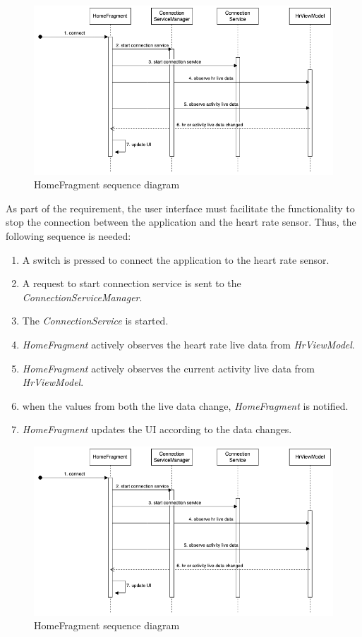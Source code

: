 \begin{figure}[H]
    \centering
    \includegraphics[width=1\textwidth]{diagrams/hr-broadcast-homefragment.drawio.png}
    \caption{HomeFragment sequence diagram}
    \label{fig:homefragment_diagram}
\end{figure}

As part of the requirement, the user interface must facilitate the functionality to stop the connection between the application and the heart rate sensor. Thus, the following sequence is needed:
\begin{enumerate}
    \item A switch is pressed to connect the application to the heart rate sensor.
    \item A request to start connection service is sent to the \emph{ConnectionServiceManager}.
    \item The \emph{ConnectionService} is started.
    \item \emph{HomeFragment} actively observes the heart rate live data from \emph{HrViewModel}.
    \item \emph{HomeFragment} actively observes the current activity live data from \emph{HrViewModel}.
    \item when the values from both the live data change, \emph{HomeFragment} is notified.
    \item \emph{HomeFragment} updates the UI according to the data changes.

\end{enumerate}

\begin{figure}[H]
    \centering
    \includegraphics[width=1\textwidth]{diagrams/hr-broadcast-homefragment.drawio.png}
    \caption{HomeFragment sequence diagram}
    \label{fig:homefragment_diagram}
\end{figure}


